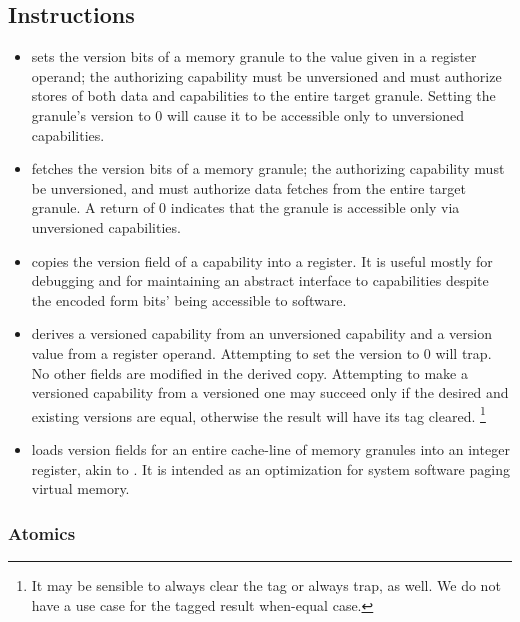 \subsection{Instructions} %

\begin{itemize}

	\item {} sets the version bits of a memory
granule to the value given in a register operand; the authorizing capability
must be unversioned and must authorize stores of both data and capabilities
to the entire target granule.  Setting the granule's version to $0$ will
cause it to be accessible only to unversioned capabilities.

	\item {} fetches the version bits of a memory
granule; the authorizing capability must be unversioned, and must authorize
data fetches from the entire target granule.  A return of $0$ indicates that
the granule is accessible only via unversioned capabilities.

	\item {} copies the version field of a
capability into a register.  It is useful mostly for debugging and for
maintaining an abstract interface to capabilities despite the encoded form
bits' being accessible to software.

	\item {} derives a versioned capability from an
unversioned capability and a version value from a register operand.
Attempting to set the version to $0$ will trap.  No other fields are
modified in the derived copy.  Attempting to make a versioned capability
from a versioned one may succeed only if the desired and existing versions are
equal, otherwise the result will have its tag cleared.%
%
\footnote{It may be sensible to always clear the tag or always trap, as
well.  We do not have a use case for the tagged result when-equal case.}

	\item {} loads version fields for an
entire cache-line of memory granules into an integer register, akin to
.  It is intended as an optimization for system software
paging virtual memory.

\end{itemize}

\subsubsection{Atomics} %

